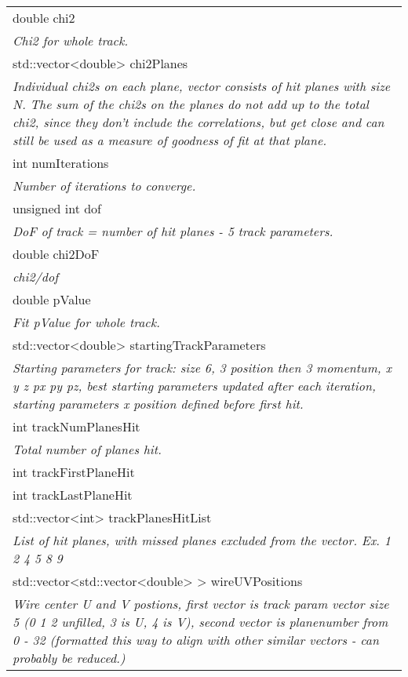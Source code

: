 \begin{longtable}{|p{16cm}|}
double chi2 \\ 
\textit{Chi2 for whole track.} \\ \hline

std::vector\textless{}double\textgreater{} chi2Planes \\
\textit{Individual chi2s on each plane, vector consists of hit planes with size N. The sum of the chi2s on the planes do not add up to the total chi2, since they don't include the correlations, but get close and can still be used as a measure of goodness of fit at that plane.} \\ \hline

int numIterations \\
\textit{Number of iterations to converge.} \\ \hline

unsigned int dof \\
\textit{DoF of track = number of hit planes - 5 track parameters.} \\ \hline

double chi2DoF \\
\textit{chi2/dof} \\ \hline

double pValue \\
\textit{Fit pValue for whole track.} \\ \hline

std::vector\textless{}double\textgreater{} startingTrackParameters \\
\textit{Starting parameters for track: size 6, 3 position then 3 momentum, x y z px py pz, best starting parameters updated after each iteration, starting parameters x position defined before first hit.} \\ \hline

int trackNumPlanesHit \\ 
\textit{Total number of planes hit.} \\ \hline

int trackFirstPlaneHit \\ \hline

int trackLastPlaneHit \\ \hline

std::vector\textless{}int\textgreater{} trackPlanesHitList \\
\textit{List of hit planes, with missed planes excluded from the vector. Ex. 1 2 4 5 8 9} \\ \hline


std::vector\textless{}std::vector\textless{}double\textgreater{} \textgreater{} wireUVPositions \\
\textit{Wire center U and V postions, first vector is track param vector size 5 (0 1 2 unfilled, 3 is U, 4 is V), second vector is planenumber from 0 - 32  (formatted this way to align with other similar vectors - can probably be reduced.)} \\ \hline


\end{longtable}
